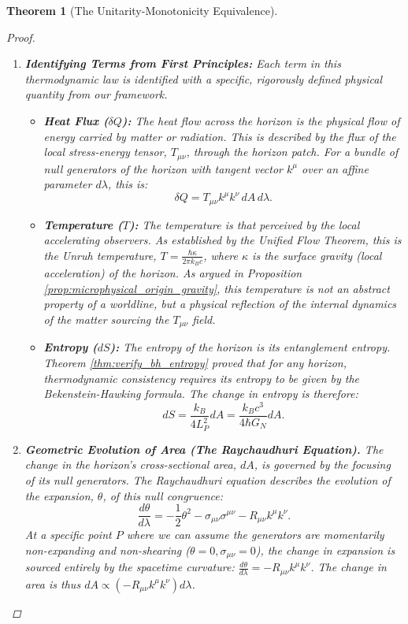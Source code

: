 \documentclass[11pt, letterpaper]{report}
\theoremstyle{plain} %
\newtheorem{theorem}{Theorem}[chapter]
\theoremstyle{definition} %
\theoremstyle{remark} %
\begin{document}
\begin{theorem}[The Unitarity-Monotonicity Equivalence]
\begin{proof}
\begin{enumerate}
    \item \textbf{Identifying Terms from First Principles:} Each term in this thermodynamic law is identified with a specific, rigorously defined physical quantity from our framework.
        \begin{itemize}
            \item \textbf{Heat Flux ($\delta Q$):} The heat flow across the horizon is the physical flow of energy carried by matter or radiation. This is described by the flux of the local stress-energy tensor, $T_{\mu\nu}$, through the horizon patch. For a bundle of null generators of the horizon with tangent vector $k^\mu$ over an affine parameter $d\lambda$, this is:
            $$ \delta Q = T_{\mu\nu}k^\mu k^\nu \, dA \, d\lambda. $$
            \item \textbf{Temperature ($T$):} The temperature is that perceived by the local accelerating observers. As established by the Unified Flow Theorem, this is the Unruh temperature, $T = \frac{\hbar \kappa}{2\pi k_B c}$, where $\kappa$ is the surface gravity (local acceleration) of the horizon. As argued in Proposition \ref{prop:microphysical_origin_gravity}, this temperature is not an abstract property of a worldline, but a physical reflection of the internal dynamics of the matter sourcing the $T_{\mu\nu}$ field.
            \item \textbf{Entropy ($dS$):} The entropy of the horizon is its entanglement entropy. Theorem \ref{thm:verify_bh_entropy} proved that for any horizon, thermodynamic consistency requires its entropy to be given by the Bekenstein-Hawking formula. The change in entropy is therefore:
            $$ dS = \frac{k_B}{4 L_P^2} dA = \frac{k_B c^3}{4\hbar G_N} dA. $$
        \end{itemize}

    \item \textbf{Geometric Evolution of Area (The Raychaudhuri Equation).} The change in the horizon's cross-sectional area, $dA$, is governed by the focusing of its null generators. The Raychaudhuri equation \cite{Raychaudhuri1955} describes the evolution of the expansion, $\theta$, of this null congruence:
    $$ \frac{d\theta}{d\lambda} = -\frac{1}{2}\theta^2 - \sigma_{\mu\nu}\sigma^{\mu\nu} - R_{\mu\nu}k^\mu k^\nu. $$
    At a specific point $P$ where we can assume the generators are momentarily non-expanding and non-shearing ($\theta=0, \sigma_{\mu\nu}=0$), the change in expansion is sourced entirely by the spacetime curvature: $\frac{d\theta}{d\lambda} = - R_{\mu\nu}k^\mu k^\nu$. The change in area is thus $dA \propto (-R_{\mu\nu}k^\mu k^\nu) d\lambda$.


\end{enumerate}
\end{proof}
\end{theorem}
\end{document}
